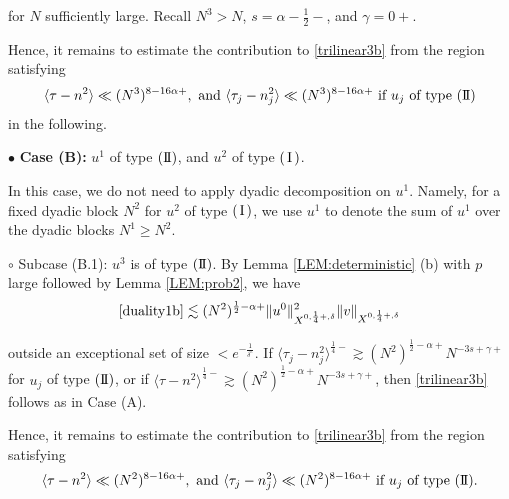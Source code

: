 \documentclass[11pt]{amsart}
\numberwithin{equation}{section} \numberwithin{theorem}{section}
\begin{document}
{
\noindent} for $N$ sufficiently large. Recall $N^3 > N$, $s = {\alpha} - \frac{1}{2}-$, and ${\gamma} = 0+$. 

Hence, it remains to estimate the contribution to \eqref{trilinear3b}
from the region satisfying
\begin{equation}
	\label{case0b} {\langle {\tau - n^2} \rangle} \ll (N^3)^{8-16{\alpha}+}, \text{ and } {\langle {\tau_j - n_j^2} \rangle} \ll (N^3)^{8-16{\alpha}+} \text{ if } u_j \text{ of type }({\text{I \hspace{-2.8mm} I} }) 
\end{equation}
in the following.

\medskip

{
\noindent} $\bullet$ {\bf Case (B):} $u^1$ of type $({\text{I \hspace{-2.8mm} I} })$, and $u^2$ of type $({\hspace{0.5mm}\text{I}\hspace{0.5mm}})$.

In this case, we do not need to apply dyadic decomposition on $u^1$.
Namely, for a fixed dyadic block $N^2$ for $u^2$ of type $({\hspace{0.5mm}\text{I}\hspace{0.5mm}})$, 
we use $u^1$ to denote the sum of $u^1$ over the dyadic blocks $N^1 \geq N^2$.

{
\noindent} $\circ$ Subcase (B.1): $u^3$ is of type $({\text{I \hspace{-2.8mm} I} })$. 
By Lemma \ref{LEM:deterministic} (b) with $p$ large followed by Lemma \ref{LEM:prob2}, we have 
\begin{align*}
	\eqref{duality1b} 
	\lesssim (N^2)^{\frac{1}{2}-{\alpha}+}\|u^0\|^2_{X^{0, \frac{1}{4}+, {\delta}}} \|v\|_{X^{0, \frac{1}{4}+, {\delta}}} 
\end{align*}

{
\noindent} outside an exceptional set of size $<e^{-\frac{1}{{\delta}^c}}$. If ${\langle {\tau_j - n_j^2} \rangle}^{\frac{1}{4}-} \gtrsim (N^2)^{\frac{1}{2}-{\alpha}+}N^{-3s+{\gamma}+}$ for $u_j$ of type $({\text{I \hspace{-2.8mm} I} })$, or if ${\langle {\tau - n^2} \rangle}^{\frac{1}{4}-} \gtrsim (N^2)^{\frac{1}{2}-{\alpha}+}N^{-3s+{\gamma}+}$, then \eqref{trilinear3b} follows as in Case (A). 

Hence, it remains to estimate the contribution to \eqref{trilinear3b}
from the region satisfying
\begin{equation}
	\label{caseAb} {\langle {\tau - n^2} \rangle} \ll (N^2)^{8-16{\alpha}+}, \text{ and } {\langle {\tau_j - n_j^2} \rangle} \ll (N^2)^{8-16{\alpha}+} \text{ if } u_j \text{ of type }({\text{I \hspace{-2.8mm} I} }). 
\end{equation}
\end{document}
